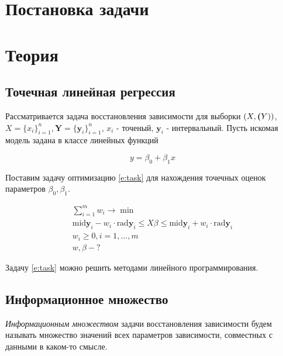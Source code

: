 \documentclass[a4paper,12pt]{article}
\begin{document}
    
    \newpage

    \tableofcontents
    \listoffigures
    \newpage

    \section{Постановка задачи}
    \section{Теория}
    \subsection{Точечная линейная регрессия}
    \quad Рассматривается задача восстановления зависимости для выборки
    $ (X, \textbf(Y))$, $ X = \{x_i\}_{i=1}^{n}, \textbf{Y} = \{\textbf{y}_i\}_{i=1}^{n} $,
    $ x_i $ - точеный, $ \textbf{y}_i $ - интервальный.
    Пусть искомая модель задана в классе линейных функций

    \begin{equation}
        y = \beta_0 + \beta_1 x
        \label{e:model}
    \end{equation}

    Поставим задачу оптимизацию \ref{e:task} для нахождения точечных оценок
    параметров $ \beta_0, \beta_1 $.

    \begin{equation}
        \begin{gathered}
            \sum_{i = 1}^{m}w_{i} \to \min \\
            \text{mid}\textbf{y}_{i} - w_{i} \cdot \text{rad}\textbf{y}_{i} \leq X\beta \leq \text{mid}\textbf{y}_{i} + w_{i} \cdot \text{rad}\textbf{y}_{i} \\
            w_{i} \geq 0, i = 1, ..., m \\
            w, \beta - ?
        \end{gathered}
        \label{e:task}
    \end{equation}
    
    Задачу \ref{e:task} можно решить методами линейного программирования.

    \subsection{Информационное множество}
    \quad \textsl{Информационным множеством} задачи восстановления зависимости
    будем называть множество значений всех параметров зависимости,
    совместных с данными в каком-то смысле. 
\end{document}
